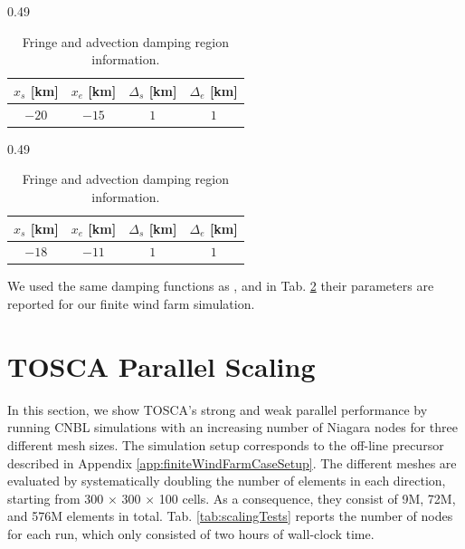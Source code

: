 \documentclass[journal abbreviation, manuscript]{copernicus}
\begin{document}
\begin{table}[H]
	\begin{center}
		\begin{subtable}[t]{0.49\textwidth}
			\centering
		    \begin{tabular}{c c c c} 
		    	\hline
		    	$x_s$ [km] & $x_e$ [km] & $\Delta_s$ [km]& $\Delta_e$ [km] \\
		    	\hline
		    	$-20$ & $-15$ & $1$ & $1$ \\
		    	\hline
		    \end{tabular}
			\caption{Fringe region parameters.}
		\end{subtable}     
		\begin{subtable}[t]{0.49\textwidth}
			\centering
			\begin{tabular}{c c c c} 
				\hline
				$x_s$ [km] & $x_e$ [km] & $\Delta_s$ [km]& $\Delta_e$ [km] \\
				\hline
				$-18$ & $-11$ & $1$ & $1$ \\
				\hline
			\end{tabular}
			\caption{Advection damping region parameters.}
		\end{subtable}
	\end{center}
	\caption{Fringe and advection damping region information.}
	\label{tab:dampingRegions}
\end{table}
We used the same damping functions as \cite{2022a_LanzilaoMeyers}, and in Tab. \ref{tab:dampingRegions} their parameters are reported for our finite wind farm simulation.  

\section{TOSCA Parallel Scaling}    %
\label{app:toscaParallelScaling}
In this section, we show TOSCA's strong and weak parallel performance by running CNBL simulations with an increasing number of Niagara nodes for three different mesh sizes. The simulation setup corresponds to the off-line precursor described in Appendix \ref{app:finiteWindFarmCaseSetup}. The different meshes are evaluated by systematically doubling the number of elements in each direction, starting from 300 $\times$ 300 $\times$ 100 cells. As a consequence, they consist of 9M, 72M, and 576M elements in total. Tab. \ref{tab:scalingTests} reports the number of nodes for each run, which only consisted of two hours of wall-clock time. 
\end{document}
